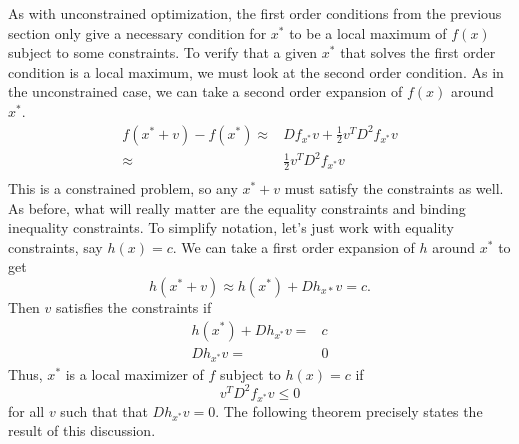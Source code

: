 As with unconstrained optimization, the first order conditions from
the previous section only give a necessary condition for $x^*$ to be a
local maximum of $f(x)$ subject to some constraints. To verify that a
given $x^*$ that solves the first order condition is a local maximum,
we must look at the second order condition. As in the unconstrained
case, we can take a second order expansion of $f(x)$ around $x^*$.
\begin{align*}
  f(x^*+v) - f(x^*) \approx & Df_{x^*} v + \frac{1}{2} v^T D^2 f_{x^*}
  v \\
  \approx &  \frac{1}{2} v^T D^2 f_{x^*} v \\
\end{align*}
This is a constrained problem, so any $x^* + v$ must satisfy the
constraints as well. As before, what will really matter are the
equality constraints and binding inequality constraints. To simplify
notation, let's just work with equality constraints, say $h(x)=c$. We
can take a first order expansion of $h$ around $x^*$ to get
\[ h(x^* + v) \approx h(x^*) + Dh_{x*} v  = c. \]
Then $v$ satisfies the constraints if
\begin{align*}
  h(x^*) + Dh_{x^*} v = & c \\
  Dh_{x^*} v = & 0
\end{align*}
Thus, $x^*$ is a local maximizer of $f$ subject to $h(x) = c$ if
\[ v^T D^2 f_{x^*} v \leq 0 \] for all $v$ such that that $Dh_{x^*} v
= 0$. The following theorem precisely states the result of this
discussion.
